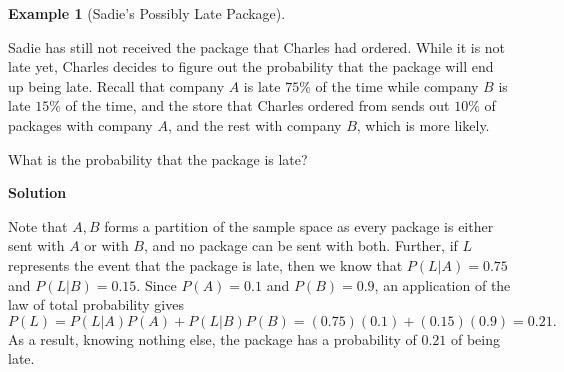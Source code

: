 \documentclass[
  letterpaper,
  DIV=11,
  numbers=noendperiod]{scrreprt}
\theoremstyle{definition}
\theoremstyle{definition}
\theoremstyle{definition}
\newtheorem{example}{Example}[chapter]
\theoremstyle{remark}
\begin{document}
\begin{example}[Sadie's Possibly Late
Package]\protect\hypertarget{exm-lotp-example}{}\label{exm-lotp-example}

Sadie has still not received the package that Charles had ordered. While
it is not late yet, Charles decides to figure out the probability that
the package will end up being late. Recall that company \(A\) is late
\(75\%\) of the time while company \(B\) is late \(15\%\) of the time,
and the store that Charles ordered from sends out \(10\%\) of packages
with company \(A\), and the rest with company \(B\), which is more
likely.

What is the probability that the package is late?

\begin{tcolorbox}[enhanced jigsaw, colback=white, breakable, rightrule=.15mm, leftrule=.75mm, toprule=.15mm, left=2mm, arc=.35mm, opacityback=0, bottomrule=.15mm]

\vspace{-3mm}\textbf{Solution}\vspace{3mm}

Note that \(A, B\) forms a partition of the sample space as every
package is either sent with \(A\) or with \(B\), and no package can be
sent with both. Further, if \(L\) represents the event that the package
is late, then we know that \(P(L|A) = 0.75\) and \(P(L|B) = 0.15\).
Since \(P(A) = 0.1\) and \(P(B) = 0.9\), an application of the law of
total probability gives
\[P(L) = P(L|A)P(A) + P(L|B)P(B) = (0.75)(0.1) + (0.15)(0.9) = 0.21.\]
As a result, knowing nothing else, the package has a probability of
\(0.21\) of being late.

\end{tcolorbox}

\end{example}
\end{document}
